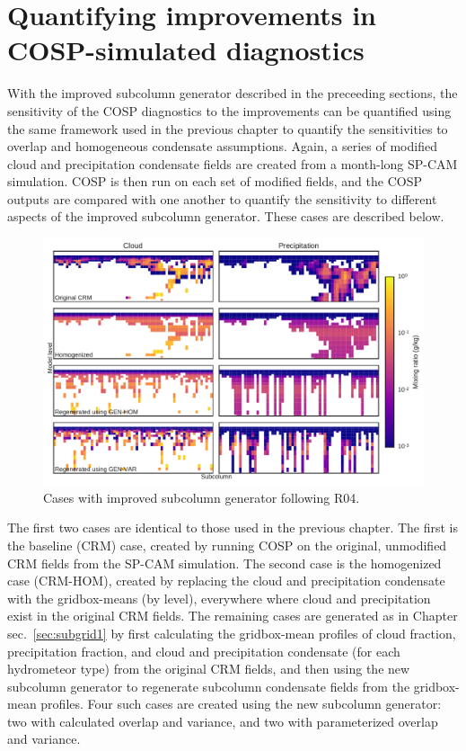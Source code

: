 \section{Quantifying improvements in COSP-simulated
diagnostics}\label{sec:subgrid2ux5fresults}

With the improved subcolumn generator described in the preceeding
sections, the sensitivity of the COSP diagnostics to the improvements
can be quantified using the same framework used in the previous chapter
to quantify the sensitivities to overlap and homogeneous condensate
assumptions. Again, a series of modified cloud and precipitation
condensate fields are created from a month-long SP-CAM simulation. COSP
is then run on each set of modified fields, and the COSP outputs are
compared with one another to quantify the sensitivity to different
aspects of the improved subcolumn generator. These cases are described
below.

\begin{figure}[htbp]
\centering
\includegraphics{graphics/mxratio_gen-var.pdf}
\caption{\label{fig:mxratio_gen-var}Cases with improved subcolumn
generator following R04.}\label{fig:mxratioux5fgen-var}
\end{figure}

The first two cases are identical to those used in the previous chapter.
The first is the baseline (CRM) case, created by running COSP on the
original, unmodified CRM fields from the SP-CAM simulation. The second
case is the homogenized case (CRM-HOM), created by replacing the cloud
and precipitation condensate with the gridbox-means (by level),
everywhere where cloud and precipitation exist in the original CRM
fields. The remaining cases are generated as in Chapter
sec.~\ref{sec:subgrid1} by first calculating the gridbox-mean profiles
of cloud fraction, precipitation fraction, and cloud and precipitation
condensate (for each hydrometeor type) from the original CRM fields, and
then using the new subcolumn generator to regenerate subcolumn
condensate fields from the gridbox-mean profiles. Four such cases are
created using the new subcolumn generator: two with calculated overlap
and variance, and two with parameterized overlap and variance.

